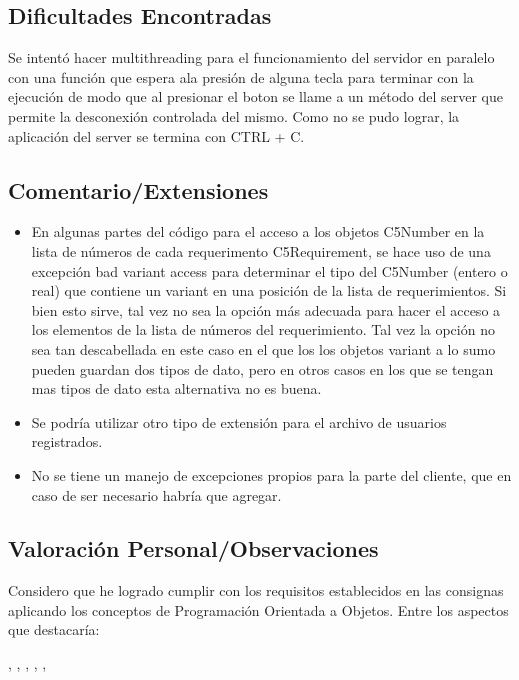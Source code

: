 \documentclass[a4paper,12pt]{article}
\begin{document}
\subsection{Dificultades Encontradas}

Se intentó hacer multithreading para el funcionamiento del servidor en paralelo
con una función que espera ala presión de alguna tecla para terminar con la ejecución
de modo que al presionar el boton se llame a un método del server que permite la desconexión
controlada del mismo. Como no se pudo lograr, la aplicación del server se termina con CTRL + C.

\subsection{Comentario/Extensiones}

\begin{itemize}
    \item
        En algunas partes del código para el acceso a los objetos C5Number en la lista de números de cada requerimento C5Requirement,
    se hace uso de una excepción bad variant access para determinar el tipo del C5Number (entero o real)
    que contiene un variant en una posición de la lista de requerimientos. Si bien esto sirve,
    tal vez no sea la opción más adecuada para hacer el acceso a los elementos de la lista de números del requerimiento.
    Tal vez la opción no sea tan descabellada en este caso en el que los los objetos variant
    a lo sumo pueden guardan dos tipos de dato, pero en otros casos en los que se tengan mas tipos de dato esta alternativa no es buena.
    \item Se podría utilizar otro tipo de extensión para el archivo de usuarios registrados.
    \item No se tiene un manejo de excepciones propios para la parte del cliente, que en caso de ser necesario habría que agregar.
\end{itemize}


\subsection{Valoración Personal/Observaciones}

Considero que he logrado cumplir con los requisitos establecidos en las consignas aplicando los conceptos de Programación Orientada a Objetos. Entre los aspectos que destacaría:

\cite{stack-overflow-template-class}, \cite{msvc-template-class}, \cite{codeproject-template-class}, \cite{isocpp-template-faq}, \cite{stack-overflow-template-header}, \cite{chatgpt}


\printbibliography[title={Bibliografía}]
\end{document}

